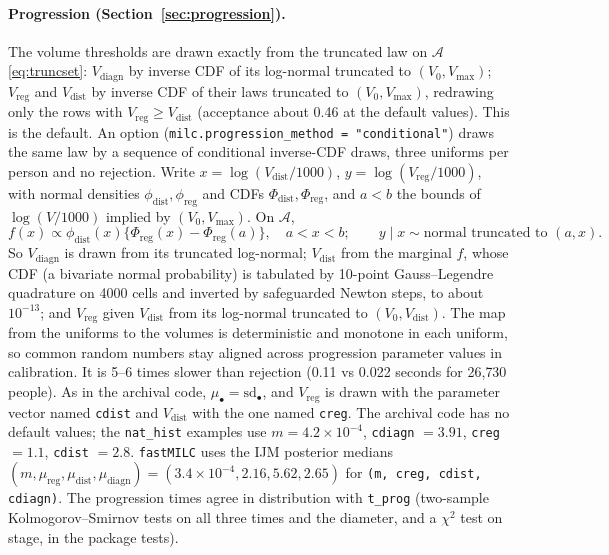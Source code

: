\documentclass[11pt]{article}
\newcommand{\code}[1]{\texttt{#1}}
\newcommand{\Vreg}{V_{\mathrm{reg}}}
\newcommand{\Vdist}{V_{\mathrm{dist}}}
\newcommand{\Vdiagn}{V_{\mathrm{diagn}}}
\begin{document}
\paragraph{Progression (Section~\ref{sec:progression}).} The volume thresholds
are drawn exactly from the truncated law on $\mathcal A$ \eqref{eq:truncset}:
$\Vdiagn$ by inverse CDF of its log-normal truncated to $(V_0,V_{\max})$;
$\Vreg$ and $\Vdist$ by inverse CDF of their laws truncated to $(V_0,V_{\max})$,
redrawing only the rows with $\Vreg\ge\Vdist$ (acceptance about 0.46 at the
default values). This is the default. An option
(\code{milc.progression\_method = "conditional"}) draws the same law by a
sequence of conditional inverse-CDF draws, three uniforms per person and no
rejection. Write $x=\log(\Vdist/1000)$, $y=\log(\Vreg/1000)$, with normal
densities $\phi_{\mathrm{dist}},\phi_{\mathrm{reg}}$ and CDFs
$\Phi_{\mathrm{dist}},\Phi_{\mathrm{reg}}$, and $a<b$ the bounds of $\log(V/1000)$
implied by $(V_0,V_{\max})$. On $\mathcal A$,
\[
f(x) \propto \phi_{\mathrm{dist}}(x)\{\Phi_{\mathrm{reg}}(x)-\Phi_{\mathrm{reg}}(a)\},
\quad a<x<b;\qquad
y\mid x \sim \text{normal truncated to } (a,x).
\]
So $\Vdiagn$ is drawn from its truncated log-normal; $\Vdist$ from the marginal
$f$, whose CDF (a bivariate normal probability) is tabulated by 10-point
Gauss--Legendre quadrature on 4000 cells and inverted by safeguarded Newton
steps, to about $10^{-13}$; and $\Vreg$ given $\Vdist$ from its log-normal
truncated to $(V_0,\Vdist)$. The map from the uniforms to the volumes is
deterministic and monotone in each uniform, so common random numbers stay
aligned across progression parameter values in calibration. It is 5--6 times
slower than rejection (0.11 vs 0.022 seconds for 26{,}730 people). As in the
archival code, $\mu_\bullet=\mathrm{sd}_\bullet$, and
$\Vreg$ is drawn with the parameter vector named \code{cdist} and $\Vdist$ with
the one named \code{creg}. The archival code has no default values; the
\code{nat\_hist} examples use $m=4.2\times10^{-4}$, \code{cdiagn} $=3.91$,
\code{creg} $=1.1$, \code{cdist} $=2.8$. \code{fastMILC} uses the IJM posterior
medians $(m,\mu_{\mathrm{reg}},\mu_{\mathrm{dist}},\mu_{\mathrm{diagn}}) =
(3.4\times10^{-4}, 2.16, 5.62, 2.65)$ for \code{(m, creg, cdist, cdiagn)}. The
progression times agree in distribution with \code{t\_prog} (two-sample
Kolmogorov--Smirnov tests on all three times and the diameter, and a $\chi^2$
test on stage, in the package tests).
\end{document}
